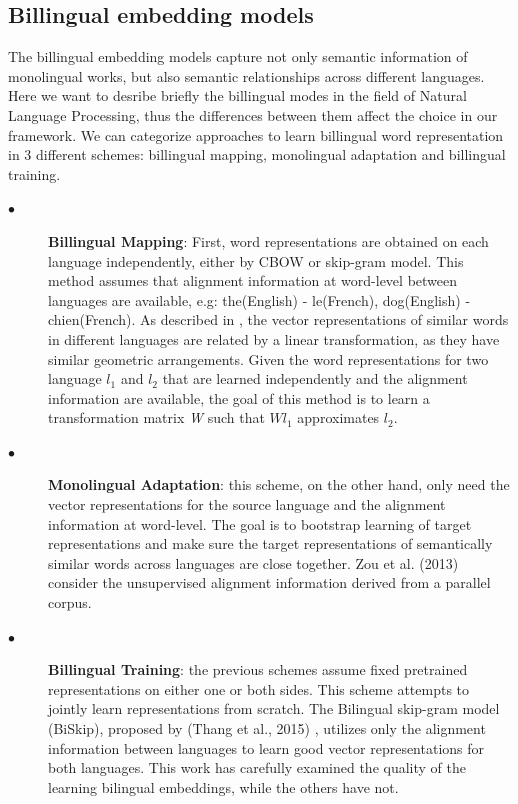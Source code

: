 \subsection{Billingual embedding models}
The billingual embedding models capture not only semantic information of monolingual works, but also semantic relationships across different languages. Here we want to desribe briefly the billingual modes in the field of Natural Language Processing, thus the differences between them affect the choice in our framework. We can categorize approaches to learn billingual word representation in 3 different schemes: billingual mapping, monolingual adaptation and billingual training.
\begin{description}
    \item [$\bullet$] \textbf{Billingual Mapping}: First, word representations are obtained on each language independently, either by CBOW or skip-gram model. This method assumes that alignment information at word-level between languages are available, e.g: the(English) - le(French), dog(English) - chien(French). As described in \cite{mikolov2013exploiting}, the vector representations of similar words in different languages are related by a linear transformation, as they have similar geometric arrangements. Given the word representations for two language \begin{math}l_{1}\end{math} and \begin{math}l_{2}\end{math} that are learned independently and the alignment information are available, the goal of this method is to learn a transformation matrix \textit{W} such that \begin{math}W l_{1}\end{math} approximates \begin{math}l_{2}\end{math}.
	\item [$\bullet$] \textbf{Monolingual Adaptation}: this scheme, on the other hand, only need the vector representations for the source language and the alignment information at word-level. The goal is to bootstrap learning of target representations and make sure the target representations of semantically similar words across languages are close together. Zou et al. (2013) consider the unsupervised alignment information derived from a parallel corpus.
	\item [$\bullet$] \textbf{Billingual Training}: the previous schemes assume fixed pretrained representations on either one or both sides. This scheme attempts to jointly learn representations from scratch. The Bilingual skip-gram model (BiSkip), proposed by (Thang et al., 2015) \cite{luong2015bilingual}, utilizes only the alignment information between languages to learn good vector representations for both languages. This work has carefully examined the quality of the learning bilingual embeddings, while the others have not.
\end{description}
